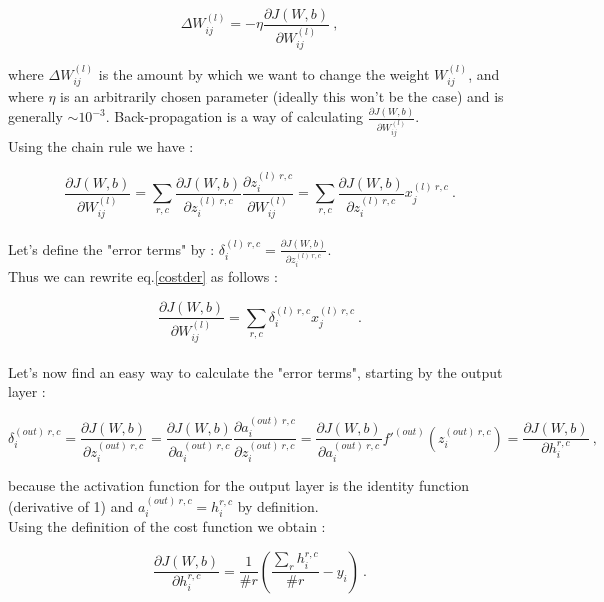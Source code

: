 \documentclass[a4paper,12pt,twoside]{article}
\begin{document}
\begin{equation}
\Delta W_{ij}^{(l)} = -\eta \frac{\partial J(W,b)}{\partial W_{ij}^{(l)}}~,
\label{graddescent}
\end{equation}

where $\Delta W_{ij}^{(l)}$ is the amount by which we want to change the weight $W_{ij}^{(l)}$, and where $\eta$ is an arbitrarily chosen parameter (ideally this won't be the case) and is generally $\sim 10^{-3}$. Back-propagation is a way of calculating $\frac{\partial J(W,b)}{\partial W_{ij}^{(l)}}$.\\
Using the chain rule we have :

\begin{equation}
\frac{\partial J(W,b)}{\partial W^{(l)}_{ij}} =\sum_{r,c} \frac{\partial J(W,b)}{\partial z^{(l)~r,c}_{i}} \frac{\partial z^{(l)~r,c}_{i}}{\partial W^{(l)}_{ij}} = \sum_{r,c} \frac{\partial J(W,b)}{\partial z^{(l)~r,c}_{i}}x_j^{(l)~r,c}~.
\label{costder}
\end{equation}
\\
Let's define the "error terms" by : $\delta^{(l)~r,c}_i = \frac{\partial J(W,b)}{\partial z^{(l)~r,c}_i}$. \\
Thus we can rewrite eq.\ref{costder} as follows :

\begin{equation}
\frac{\partial J(W,b)}{\partial W^{(l)}_{ij}} =\sum_{r,c} \delta^{(l)~r,c}_i x_j^{(l)~r,c}~.
\end{equation}
\\
Let's now find an easy way to calculate the "error terms", starting by the output layer : 

\begin{equation}
\delta^{(out)~r,c}_i  = \frac{\partial J(W,b)}{\partial z^{(out)~r,c}_i} = \frac{\partial J(W,b)}{\partial a^{(out)~r,c}_i} \frac{\partial a^{(out)~r,c}_i}{\partial z^{(out)~r,c}_i} = \frac{\partial J(W,b)}{\partial a^{(out)~r,c}_i} f'^{(out)}(z^{(out)~r,c}_i) = \frac{\partial J(W,b)}{\partial h^{r,c}_i}~,
\label{deltaout}
\end{equation}

because the activation function for the output layer is the identity function (derivative of 1) and $a^{(out)~r,c}_i = h^{r,c}_i$ by definition.\\
Using the definition of the cost function we obtain : 

\begin{equation}
\frac{\partial J(W,b)}{\partial h^{r,c}_i}  = \frac{1}{\# r}\left(\frac{\sum_r h_i^{r,c}}{\# r} - y_i \right)~.
\end{equation}
 \\
\end{document}
